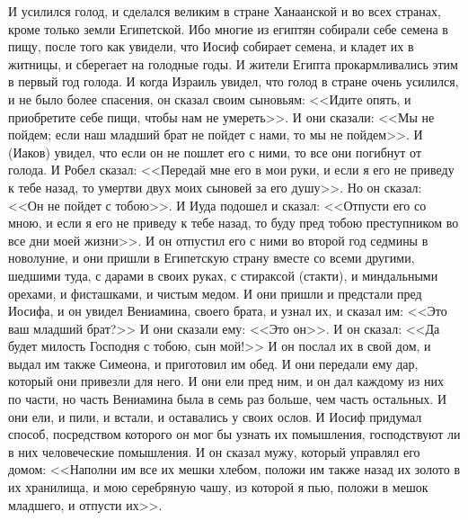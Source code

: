 И усилился голод, и сделался великим в стране
Ханаанской и во всех странах, кроме только земли
Египетской. Ибо многие из египтян собирали себе
семена в пищу, после того как увидели, что Иосиф
собирает семена, и кладет их в житницы, и
сберегает на голодные годы. И жители Египта
прокармливались этим в первый год голода. И когда
Израиль увидел, что голод в стране очень
усилился, и не было более спасения, он сказал
своим сыновьям: <<Идите опять, и приобретите
себе пищи, чтобы нам не умереть>>. И они сказали:
<<Мы не пойдем; если наш младший брат не пойдет с
нами, то мы не пойдем>>. И (Иаков) увидел, что
если он не пошлет его с ними, то все они погибнут
от голода. И Робел сказал: <<Передай мне его в
мои руки, и если я его не приведу к тебе назад, то
умертви двух моих сыновей за его душу>>. Но он
сказал: <<Он не пойдет с тобою>>. И Иуда подошел
и сказал: <<Отпусти его со мною, и если я его не
приведу к тебе назад, то буду пред тобою
преступником во все дни моей жизни>>. И он
отпустил его с ними во второй год седмины в
новолуние, и они пришли в Египетскую страну
вместе со всеми другими, шедшими туда, с дарами в
своих руках, с стираксой (стакти), и миндальными
орехами, и фисташками, и чистым медом. И они
пришли и предстали пред Иосифа, и он увидел
Вениамина, своего брата, и узнал их, и сказал им:
<<Это ваш младший брат?>> И они сказали ему:
<<Это он>>. И он сказал: <<Да будет милость
Господня с тобою, сын мой!>> И он послал их в свой
дом, и выдал им также Симеона, и приготовил им
обед. И они передали ему дар, который они привезли
для него. И они ели пред ним, и он дал каждому из
них по части, но часть Вениамина была в семь раз
больше, чем часть остальных. И они ели, и пили, и
встали, и оставались у своих ослов. И Иосиф
придумал способ, посредством которого он мог бы
узнать их помышления, господствуют ли в них
человеческие помышления. И он сказал мужу,
который управлял его домом: <<Наполни им все их
мешки хлебом, положи им также назад их золото в их
хранилища, и мою серебряную чашу, из которой я
пью, положи в мешок младшего, и отпусти их>>.

